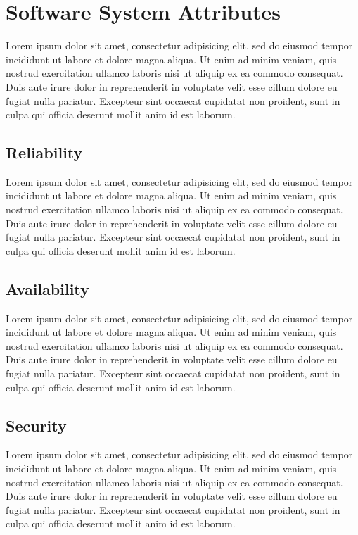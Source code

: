 \documentclass[10pt,a4paper]{report}
\begin{document}
	\section{Software System Attributes}
	Lorem ipsum dolor sit amet, consectetur adipisicing elit, sed do eiusmod
	tempor incididunt ut labore et dolore magna aliqua. Ut enim ad minim veniam,
	quis nostrud exercitation ullamco laboris nisi ut aliquip ex ea commodo
	consequat. Duis aute irure dolor in reprehenderit in voluptate velit esse
	cillum dolore eu fugiat nulla pariatur. Excepteur sint occaecat cupidatat non
	proident, sunt in culpa qui officia deserunt mollit anim id est laborum.
	
	\subsection{Reliability}
	Lorem ipsum dolor sit amet, consectetur adipisicing elit, sed do eiusmod
	tempor incididunt ut labore et dolore magna aliqua. Ut enim ad minim veniam,
	quis nostrud exercitation ullamco laboris nisi ut aliquip ex ea commodo
	consequat. Duis aute irure dolor in reprehenderit in voluptate velit esse
	cillum dolore eu fugiat nulla pariatur. Excepteur sint occaecat cupidatat non
	proident, sunt in culpa qui officia deserunt mollit anim id est laborum.
	
	\subsection{Availability}
	Lorem ipsum dolor sit amet, consectetur adipisicing elit, sed do eiusmod
	tempor incididunt ut labore et dolore magna aliqua. Ut enim ad minim veniam,
	quis nostrud exercitation ullamco laboris nisi ut aliquip ex ea commodo
	consequat. Duis aute irure dolor in reprehenderit in voluptate velit esse
	cillum dolore eu fugiat nulla pariatur. Excepteur sint occaecat cupidatat non
	proident, sunt in culpa qui officia deserunt mollit anim id est laborum.
	
	\subsection{Security}
	Lorem ipsum dolor sit amet, consectetur adipisicing elit, sed do eiusmod
	tempor incididunt ut labore et dolore magna aliqua. Ut enim ad minim veniam,
	quis nostrud exercitation ullamco laboris nisi ut aliquip ex ea commodo
	consequat. Duis aute irure dolor in reprehenderit in voluptate velit esse
	cillum dolore eu fugiat nulla pariatur. Excepteur sint occaecat cupidatat non
	proident, sunt in culpa qui officia deserunt mollit anim id est laborum.
	
\end{document}
